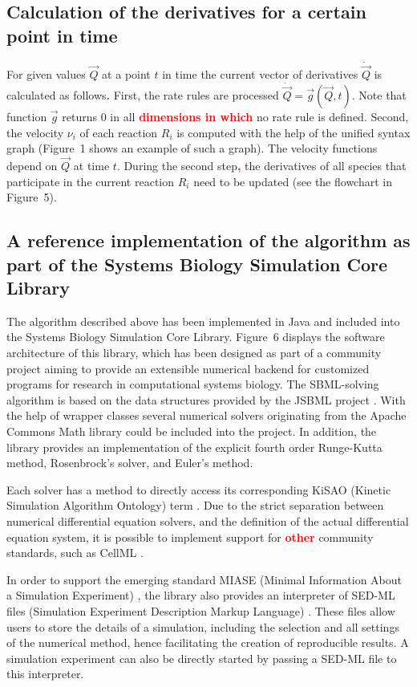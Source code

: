 \documentclass[10pt]{bmc_article}
\newenvironment{bmcformat}{\baselineskip20pt\sloppy\setboolean{publ}{false}}{\baselineskip20pt\sloppy}
\newcommand{\TODO}[1]{\textcolor{red}{\textbf{#1}}}
\begin{document}
\begin{bmcformat}
\subsection*{Calculation of the derivatives for a certain point in time}
For given values $\vec{Q}$ at a point $t$ in time the current vector of derivatives $\dot{\vec{Q}}$ is calculated as follows\TODO{.}
First, the rate rules are processed $\dot{\vec{Q}} = \vec{g}(\vec{Q}, t)$. Note that function $\vec{g}$ returns 0 in all \TODO{dimensions
in which} no rate rule is defined.
Second, the velocity $\nu_i$ of each reaction $R_i$ is computed with the help of the unified syntax graph (Figure~1 shows an example of such a graph).
The velocity functions depend on $\vec{Q}$ at time $t$.
During the second step\TODO{,} the derivatives of all species that participate in the current reaction $R_i$ need to be updated (see the flowchart in Figure~5).

\subsection*{A reference implementation of the algorithm as part of the Systems
Biology Simulation Core Library}

The algorithm described above has been implemented in Java\texttrademark{} and
included into the Systems Biology Simulation Core Library.
Figure~6 displays the software architecture of this library, which
has been designed as part of a community project aiming to provide an extensible
numerical backend for customized programs for research in computational systems
biology.
The SBML-solving algorithm is based on the data structures provided by the JSBML
project \cite{Draeger2008}.
With the help of wrapper classes several numerical solvers originating from the
Apache Commons Math library could be included into the project.
In addition, the library provides an implementation of the explicit fourth order
Runge-Kutta method, Rosenbrock's solver, and Euler's method.

Each solver has a method to directly access its corresponding KiSAO (Kinetic
Simulation Algorithm Ontology) term \cite{Courtot2011}.
Due to the strict separation between numerical differential equation solvers,
and the definition of the actual differential equation system, it is possible to
implement support for \TODO{other} community standards, such as CellML
\cite{Lloyd2004}.

In order to support the emerging standard MIASE (Minimal Information About a
Simulation Experiment) \cite{Waltemath2011a}, the library also provides an
interpreter of SED-ML files (Simulation Experiment Description Markup Language)
\cite{Waltemath2011}.
These files allow users to store the details of a simulation, including the
selection and all settings of the numerical method, hence facilitating the
creation of reproducible results.
A simulation experiment can also be directly started by passing a SED-ML file to
this interpreter.


\end{bmcformat}
\end{document}
